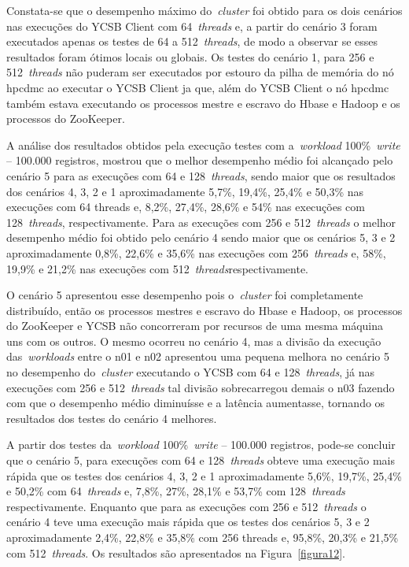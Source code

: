 \documentclass[12pt]{article}
\begin{document}
Constata-se que o desempenho máximo do~\emph{cluster}  foi obtido para os dois cenários nas execuções do YCSB Client com 64~\emph{threads} e, a partir do cenário 3 foram executados apenas os testes de 64 a 512~\emph{threads}, de modo a observar se esses resultados foram ótimos locais ou globais. 
Os testes do cenário 1, para 256 e 512~\emph{threads} não puderam ser executados por estouro da pilha de memória do nó hpcdmc ao executar o YCSB Client ja que, além do YCSB Client o nó hpcdmc também estava executando os processos mestre e escravo do Hbase e Hadoop e os processos do ZooKeeper.

A análise dos resultados obtidos pela execução testes com a~\emph{workload} 100\%~\emph{write} -- 100.000 registros, mostrou que o melhor desempenho médio foi alcançado pelo cenário 5 para as execuções com 64 e 128~\emph{threads}, sendo maior que os resultados dos cenários 4, 3, 2 e 1 aproximadamente 5,7\%, 19,4\%, 25,4\% e 50,3\% nas execuções com 64 threads e, 8,2\%, 27,4\%, 28,6\% e 54\% nas execuções com 128~\emph{threads}, respectivamente.
Para as execuções com 256 e 512~\emph{threads} o melhor desempenho médio foi obtido pelo cenário 4 sendo maior que os cenários 5, 3 e 2 aproximadamente 0,8\%, 22,6\% e 35,6\% nas execuções com 256~\emph{threads} e, 58\%, 19,9\% e 21,2\% nas execuções com 512~\emph{threads}respectivamente.

O cenário 5 apresentou esse desempenho pois o~\emph{cluster} foi completamente distribuído, então os processos mestres e escravo do Hbase e Hadoop, os processos do ZooKeeper e YCSB não concorreram por recursos de uma mesma máquina uns com os outros.
O mesmo ocorreu no cenário 4, mas a divisão da execução das~\emph{workloads} entre o n01 e n02 apresentou uma pequena melhora no cenário 5 no desempenho do~\emph{cluster}  executando o YCSB com 64 e 128~\emph{threads}, já nas execuções com 256 e 512~\emph{threads} tal divisão sobrecarregou demais o n03 fazendo com que o desempenho médio diminuísse e a latência aumentasse, tornando os resultados dos testes do cenário 4 melhores.

A partir dos testes da~\emph{workload} 100\%~\emph{write} -- 100.000 registros, pode-se concluir que o cenário 5, para execuções com 64 e 128~\emph{threads} obteve uma execução mais rápida que os testes dos cenários 4, 3, 2 e 1 aproximadamente 5,6\%, 19,7\%, 25,4\% e 50,2\% com 64~\emph{threads} e, 7,8\%, 27\%, 28,1\% e 53,7\% com 128~\emph{threads} respectivamente. 
Enquanto que para as execuções com 256 e 512~\emph{threads} o cenário 4 teve uma execução mais rápida que os testes dos cenários 5, 3 e 2 aproximadamente 2,4\%, 22,8\% e 35,8\% com 256 threads e, 95,8\%, 20,3\% e 21,5\% com 512~\emph{threads}. 
Os resultados são apresentados na Figura~\ref{figura12}.
\end{document}
